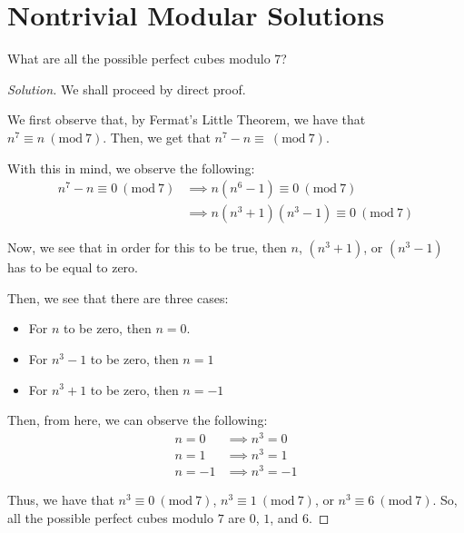 \documentclass{article}
\newenvironment{solution}{\begin{proof}[Solution]}{\end{proof}}
\newcommand{\Mod}[1]{\ (\mathrm{mod}\ {#1})}
\begin{document}
\newpage

\section{Nontrivial Modular Solutions}
\begin{hw}
	What are all the possible perfect cubes modulo 7?
\end{hw}
\begin{solution}
	We shall proceed by direct proof.
	
	We first observe that, by Fermat's Little Theorem, we have that $n^{7} \equiv n \Mod{7}$. Then, we get that $n^{7} - n \equiv \Mod{7}$.
	
	With this in mind, we observe the following:
	\begin{align*}
		n^{7} - n \equiv 0 \Mod{7} &\implies n(n^{6} - 1) \equiv 0 \Mod{7}\\
		&\implies n(n^{3}+1)(n^{3}-1) \equiv 0 \Mod{7}
	\end{align*}

	Now, we see that in order for this to be true, then $n$, $(n^{3}+1)$, or $(n^{3} -1)$ has to be equal to zero.
	
	Then, we see that there are three cases:
	\begin{itemize}
		\item For $n$ to be zero, then $n=0$.
		\item For $n^{3}-1$ to be zero, then $n=1$
		\item For $n^{3}+1$ to be zero, then $n=-1$
	\end{itemize}

	Then, from here, we can observe the following:
	\begin{align*}
		n = 0 &\implies n^{3} = 0 \\
		n = 1 &\implies n^{3} = 1 \\
		n = -1 &\implies n^{3} = -1
	\end{align*}

	Thus, we have that $n^{3} \equiv 0 \Mod{7}$, $n^{3} \equiv 1 \Mod{7}$, or $n^{3} \equiv 6 \Mod{7}$. So, all the possible perfect cubes modulo $7$ are $0$, $1$, and $6$.
\end{solution}
\end{document}
